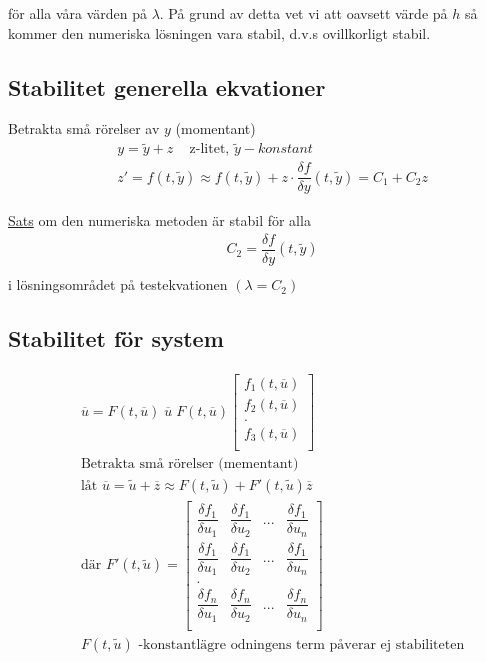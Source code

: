 \begin{multicols}{2}
för alla våra värden på $\lambda$. På grund av detta vet vi att oavsett värde på $h$ så kommer den numeriska lösningen vara stabil, d.v.s ovillkorligt stabil.


\subsection{Stabilitet generella ekvationer}
Betrakta små rörelser av $y$ (momentant)
\begin{align*}
  &\quad  y=\tilde{y}+z \;\;\; \text{  z-litet, $\tilde{y}-konstant$} \\
  &\quad  z'=f(t,\tilde{y}) \approx f(t,\tilde{y})+z\cdot\dfrac{\delta f}{\delta y}(t,\tilde{y}) = C_1+C_2z
\end{align*}

\underline{Sats} om den numeriska metoden är stabil för alla 
\begin{align*}
  &\quad  C_2=\dfrac{\delta f}{\delta y}(t,\tilde{y}) \\
\end{align*}
i lösningsområdet på testekvationen $(\lambda=C_2)$

\subsection{Stabilitet för system}
\begin{align*}
  &\quad  \overline{u} = F(t,\overline{u}) \; \overline{u} \; F(t,\overline{u})
  \begin{bmatrix}
    f_1(t,\overline{u})\\
    f_2(t,\overline{u})\\
    .\\
    f_3(t,\overline{u})\\
  \end{bmatrix}\\
  &\quad  \text{Betrakta små rörelser (mementant)} \\
  &\quad  \text{låt } \overline{u}=\tilde{u}+\overline{z} \approx F(t,\tilde{u})+F'(t,\tilde{u})\overline{z} \\
  &\quad  \text{där } F'(t,\tilde{u})=
  \begin{bmatrix}
    \dfrac{\delta f_1}{\delta u_1} & \dfrac{\delta f_1}{\delta u_2} & ... & \dfrac{\delta f_1}{\delta u_n} \\
    \dfrac{\delta f_1}{\delta u_1} & \dfrac{\delta f_1}{\delta u_2} & ... & \dfrac{\delta f_1}{\delta u_n} \\
    . & & & \\
    \dfrac{\delta f_n}{\delta u_1} & \dfrac{\delta f_n}{\delta u_2} & ... & \dfrac{\delta f_n}{\delta u_n} \\
  \end{bmatrix}\\
  &\quad F(t,\tilde{u}) \text{ -konstantlägre odningens term påverar ej stabiliteten}\\
\end{align*}


\end{multicols}
